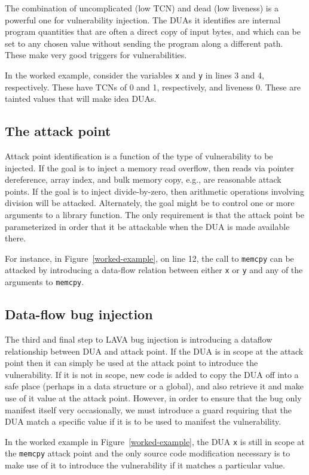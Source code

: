 The combination of uncomplicated (low TCN) and dead (low liveness) is a powerful one for vulnerability injection.
The DUAs it identifies are internal program quantities that are often a direct copy of input bytes, and which can be set to any chosen value without sending the program along a different path.  
These make very good triggers for vulnerabilities.

In the worked example, consider the variables \verb+x+ and \verb+y+ in lines 3 and 4, respectively.
These have TCNs of 0 and 1, respectively, and liveness 0. 
These are tainted values that will make idea DUAs.

\subsection {The attack point}

Attack point identification is a function of the type of vulnerability to be injected.
If the goal is to inject a memory read overflow, then reads via pointer dereference, array index, and bulk memory copy, e.g., are reasonable attack points.  
If the goal is to inject divide-by-zero, then arithmetic operations involving division will be attacked. 
Alternately, the goal might be to control one or more arguments to a library function.
The only requirement is that the attack point be parameterized in order that it be attackable when the DUA is made available there. 

For instance, in Figure~\ref{worked-example}, on line 12, the call to \verb+memcpy+ can be attacked by introducing a data-flow relation between either \verb+x+ or \verb+y+ 
and any of the arguments to \verb+memcpy+.

\subsection {Data-flow bug injection}

The third and final step to LAVA bug injection is introducing a dataflow relationship between DUA and attack point.  
If the DUA is in scope at the attack point then it can simply be used at the attack point to introduce the vulnerability.
If it is not in scope, new code is added to copy the DUA off into a safe place (perhaps in a data structure or a global), and also retrieve it and  make use of it value at the attack point. 
However, in order to ensure that the bug only manifest itself very occasionally, we must introduce a guard requiring that the DUA match a specific value if it is to be used to manifest the vulnerability.

In the worked example in Figure~\ref{worked-example}, the DUA \verb+x+ is still in scope at the \verb+memcpy+ attack point and
 the only source code modification necessary is to make use of it to introduce the vulnerability if it matches a particular value.  









